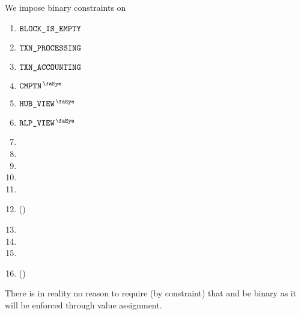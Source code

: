 We impose binary constraints on
\begin{multicols}{2}
	\begin{enumerate}
		\item $\texttt{BLOCK\_IS\_EMPTY}$
		\item $\texttt{TXN\_PROCESSING}$
		\item $\texttt{TXN\_ACCOUNTING}$
		\item $\isUserTxnComputation$
		\item $\isUserTxnHubView$
		\item $\isUserTxnRlpView$
		\item \txIsLegacy{}
		\item \txIsAccessSet{}
		\item \txIsTypeTwo{}
		\item \txIsDeployment{}
		\item \txStatusCode{}
		\item \txCopyTxcd{} \quad (\trash)
		\item \txRequiresEvmExecution{}
		\item \eucFlag{}
		\item \wcpFlag{}
		\item \isLastTxOfBlock{} \quad (\trash)
	\end{enumerate}
\end{multicols}
\saNote{}
There is in reality no reason to require (by constraint) that \txCopyTxcd{} and \isLastTxOfBlock{} be binary as it will be enforced through value assignment.
